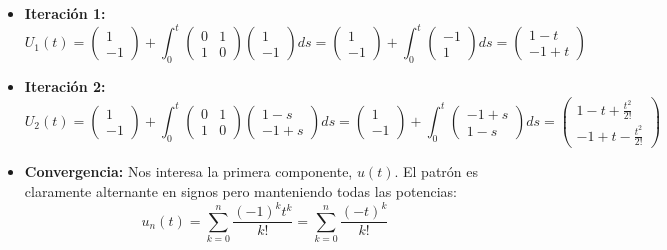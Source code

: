 {\begin{enumerate} [label=\alph*)]
            \begin{itemize}
                \item \textbf{Iteración 1:}
                $$U_1(t) = \begin{pmatrix} 1 \\ -1 \end{pmatrix} + \int_0^t \begin{pmatrix} 0 & 1 \\ 1 & 0 \end{pmatrix} \begin{pmatrix} 1 \\ -1 \end{pmatrix} ds = \begin{pmatrix} 1 \\ -1 \end{pmatrix} + \int_0^t \begin{pmatrix} -1 \\ 1 \end{pmatrix} ds = \begin{pmatrix} 1 - t \\ -1 + t \end{pmatrix}$$
                \item \textbf{Iteración 2:}
                $$U_2(t) = \begin{pmatrix} 1 \\ -1 \end{pmatrix} + \int_0^t \begin{pmatrix} 0 & 1 \\ 1 & 0 \end{pmatrix} \begin{pmatrix} 1 - s \\ -1 + s \end{pmatrix} ds = \begin{pmatrix} 1 \\ -1 \end{pmatrix} + \int_0^t \begin{pmatrix} -1 + s \\ 1 - s \end{pmatrix} ds = \begin{pmatrix} 1 - t + \frac{t^2}{2!} \\ -1 + t - \frac{t^2}{2!} \end{pmatrix}$$
                \item \textbf{Convergencia:} Nos interesa la primera componente, $u(t)$. El patrón es claramente alternante en signos pero manteniendo todas las potencias:
                $$u_n(t) = \sum_{k=0}^n \frac{(-1)^k t^k}{k!} = \sum_{k=0}^n \frac{(-t)^k}{k!}$$

\end{itemize}
\end{enumerate}}
